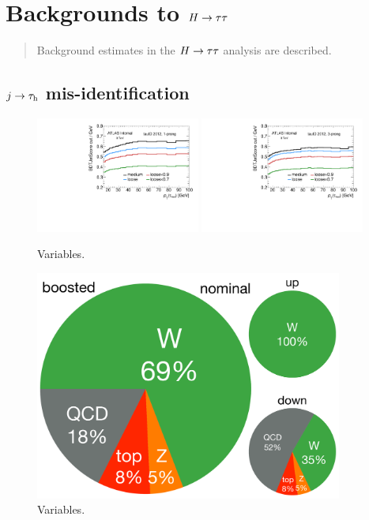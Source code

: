 \chapter[Backgrounds to $\Htautau$][Backgrounds to $\Htautau$]{Backgrounds to $\Htautau$}
\label{chap:results}

\begin{quote}
Background estimates in the $\Htautau$ analysis are described.
\end{quote}

\section{$j \rightarrow \tau_\mathrm{h}$ mis-identification}
\label{sec:backgrounds-misid}

\begin{figure}[tp]
  \centering
  \includegraphics[width=0.48\textwidth]{figures/backgrounds/jetBDT-1p}
  \includegraphics[width=0.48\textwidth]{figures/backgrounds/jetBDT-3p}
  \caption{Variables.}
  \label{fig:backgrounds-workingpoints}
\end{figure}

\begin{figure}[tp]
  \centering
  \includegraphics[width=0.90\textwidth]{figures/backgrounds/rx-boost}
  \caption{Variables.}
  \label{fig:backgrounds-rx-boost}
\end{figure}


